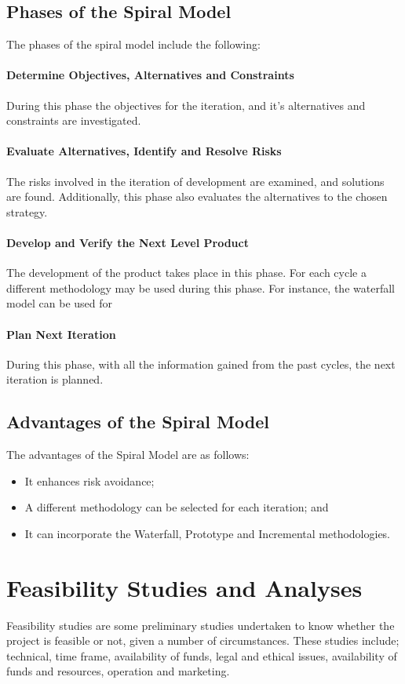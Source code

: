 \subsection{Phases of the Spiral Model}
The phases of the spiral model include the following:

\paragraph{Determine Objectives, Alternatives and Constraints}
During this phase the objectives for the iteration, and it's alternatives and constraints are investigated.

\paragraph{Evaluate Alternatives, Identify and Resolve Risks}
The risks involved in the iteration of development are examined, and solutions are found. Additionally, this phase also evaluates the alternatives to the chosen strategy.

\paragraph{Develop and Verify the Next Level Product}
The development of the product takes place in this phase. For each cycle a different methodology may be used during this phase. For instance, the waterfall model can be used for 

\paragraph{Plan Next Iteration}
During this phase, with all the information gained from the past cycles, the next iteration is planned.

\subsection{Advantages of the Spiral Model}
The advantages of the Spiral Model are as follows:
\begin{itemize}
	\item It enhances risk avoidance;
	\item A different methodology can be selected for each iteration; and 
	\item It can incorporate the Waterfall, Prototype and Incremental methodologies.
\end{itemize}

\section{Feasibility Studies and Analyses}
Feasibility studies are some preliminary studies undertaken to know whether the project is feasible or not, given a number of circumstances. These studies include; technical, time frame, availability of funds, legal and ethical issues, availability of funds and resources, operation and marketing.

